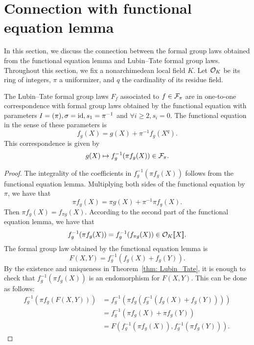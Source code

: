 \section{Connection with functional equation lemma}

In this section, we discuss the connection between the formal group laws obtained from the
functional equation lemma and Lubin--Tate formal group laws. Throughout this section,
we fix a nonarchimedean local field $K$. Let $\mathcal{O}_K$ be its ring of integers,
$\pi$ a uniformizer, and $q$ the cardinality of its residue field.

\begin{proposition}
    The Lubin--Tate formal group laws $F_f$ associated to $f\in \mathcal{F}_\pi$ are in one-to-one
    correspondence with formal group laws obtained by the functional equation with
    parameters $I = (\pi), \sigma = \mathrm{id}, s_1 = \pi^{-1}$ and $\forall i \ge 2, s_i = 0$.
    The functional equation in the sense of these parameters is
    \[ f_g(X) = g(X) + \pi^ {-1}f_g(X ^ q). \]
    This correspondence is given by
    \[g(X) \mapsto f_g^{-1}(\pi f_g(X)) \in \mathcal{F}_\pi. \]
\end{proposition}

\begin{proof}
    The integrality of the coefficients in $f_g^{-1}(\pi f_g(X))$ follows from the
    functional equation lemma. Multiplying both sides of the functional equation by $\pi$,
    we have that
    \[ \pi f_g(X) = \pi g(X) + \pi^{-1} \pi f_g(X). \]
    Then $\pi f_g(X) = f_{\pi g}(X)$. According to the second part of the functional
    equation lemma, we have that
    \[f_g^{-1} (\pi f_g(X)) = f_g^{-1} (f_{\pi g}(X)) \in \mathcal{O}_K[\![X]\!]. \]
    The formal group law obtained by the functional equation lemma is
    \[ F(X,Y) = f_g^{-1} (f_g(X) + f_g(Y)) . \]
    By the existence and uniqueness in Theorem~\ref{thm: Lubin_Tate}, it is enough
    to check that $f_g^{-1}(\pi f_g(X))$ is an endomorphism for $F(X,Y)$. This can be done as follows:
    \begin{align*}
        f_g^{-1} (\pi f_g(F(X,Y))) &= f_g^{-1} (\pi f_g(f_g^{-1} (f_g(X) + f_g(Y)))) \\
            & = f_g^{-1} (\pi f_g(X) + \pi f_g(Y)) \\
            & = F(f_g^{-1}(\pi f_g(X)), f_g^{-1}(\pi f_g(Y))).
    \end{align*}
\end{proof}